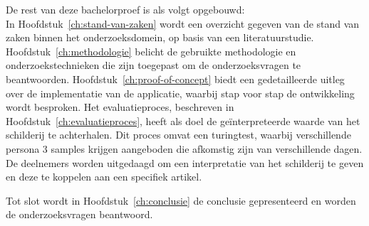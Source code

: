 
De rest van deze bachelorproef is als volgt opgebouwd: \\

In Hoofdstuk~\ref{ch:stand-van-zaken} wordt een overzicht gegeven van de stand van zaken binnen het onderzoeksdomein, op basis van een literatuurstudie. \\
Hoofdstuk~\ref{ch:methodologie} belicht de gebruikte methodologie en onderzoekstechnieken die zijn toegepast om de onderzoeksvragen te beantwoorden.
Hoofdstuk~\ref{ch:proof-of-concept} biedt een gedetailleerde uitleg over de implementatie van de applicatie, waarbij stap voor stap de ontwikkeling wordt besproken.
Het evaluatieproces, beschreven in Hoofdstuk~\ref{ch:evaluatieproces}, heeft als doel de geïnterpreteerde waarde van het schilderij te achterhalen. Dit proces omvat een turingtest, waarbij verschillende persona 3 samples krijgen aangeboden die afkomstig zijn van verschillende dagen. De deelnemers worden uitgedaagd om een interpretatie van het schilderij te geven en deze te koppelen aan een specifiek artikel.

Tot slot wordt in Hoofdstuk~\ref{ch:conclusie} de conclusie gepresenteerd en worden de onderzoeksvragen beantwoord.